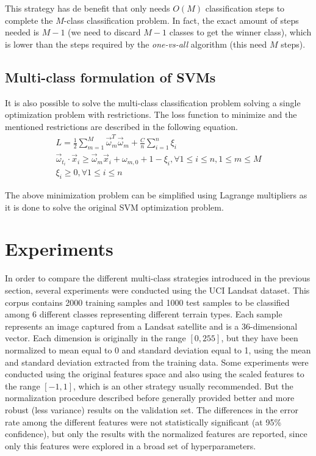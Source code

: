 \documentclass[10pt,a4paper]{article}
\begin{document}
This strategy has de benefit that only needs $O(M)$ classification steps to complete the $M$-class classification problem. In fact, the exact amount of steps needed is $M-1$ (we need to discard $M-1$ classes to get the winner class), which is lower than the steps required by the \emph{one-vs-all} algorithm (this need $M$ steps).

\subsection{Multi-class formulation of SVMs}\label{sec:multiclass}
It is also possible to solve the multi-class classification problem solving a single optimization problem\cite{crammer2002algorithmic} with restrictions. The loss function to minimize and the mentioned restrictions are described in the following equation.\\

\begin{eqnarray}
L = \frac{1}{2} \sum_{m=1}^{M} \vec{\omega}_m^T \vec{\omega}_m + \frac{C}{n} \sum_{i=1}^n \xi_i\\
\vec{\omega}_{t_i} \cdot \vec{x}_i \geq \vec{\omega}_m \vec{x}_i + \omega_{m,0} + 1 - \xi_i, \forall 1 \leq i \leq n, 1 \leq m \leq M \\
\xi_i \geq 0, \forall 1 \leq i \leq n
\end{eqnarray}

The above minimization problem can be simplified using Lagrange multipliers as it is done to solve the original SVM optimization problem.

\section{Experiments}
In order to compare the different multi-class strategies introduced in the previous section, several experiments were conducted using the UCI Landsat dataset\cite{Bache+Lichman:2013}. This corpus contains 2000 training samples and 1000 test samples to be classified among 6 different classes representing different terrain types. Each sample represents an image captured from a Landsat satellite and is a 36-dimensional vector. Each dimension is originally in the range $[0, 255]$, but they have been normalized to mean equal to 0 and standard deviation equal to 1, using the mean and standard deviation extracted from the training data. Some experiments were conducted using the original features space and also using the scaled features to the range $[-1,1]$, which is an other strategy usually recommended. But the normalization procedure described before generally provided better and more robust (less variance) results on the validation set. The differences in the error rate among the different features were not statistically significant (at 95\% confidence), but only the results with the normalized features are reported, since only this features were explored in a broad set of hyperparameters.\\
\end{document}
